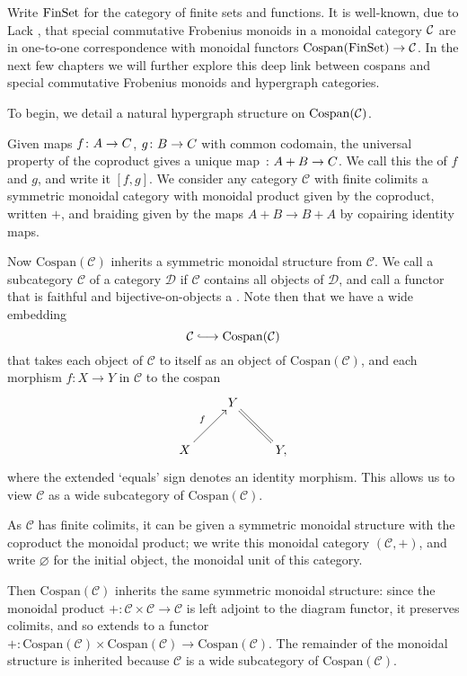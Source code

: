 Write $\mathrm{FinSet}$ for the category of finite sets and functions. It is well-known,
due to Lack \cite{Lac0}, that special commutative Frobenius monoids in a
monoidal category $\mathcal C$ are in one-to-one correspondence with monoidal
functors $\operatorname{{Cospan}}(\mathrm{FinSet}) \to \mathcal C$. In the next few chapters we will further
explore this deep link between cospans and special commutative Frobenius monoids
and hypergraph categories. 

To begin, we detail a natural hypergraph structure on $\operatorname{{Cospan}}(\mathcal C)$.

Given maps $f {\colon} A \to C$, $g {\colon} B \to C$ with common codomain, the
universal property of the coproduct gives a unique map ${\colon} A+B \to C$. We
call this the  of $f$ and $g$, and write it $[f,g]$. 
We consider any category $\mathcal C$ with finite colimits a symmetric monoidal category with
monoidal product given by the coproduct, written $+$, and braiding given by the
maps $A+B \to B+A$ by copairing identity maps. 

Now $\mathrm{Cospan(\mathcal C)}$ inherits a symmetric monoidal structure from
$\mathcal C$. We call a subcategory $\mathcal C$ of a category $\mathcal D$
 if $\mathcal C$ contains all objects of $\mathcal D$, and call a
functor that is faithful and bijective-on-objects a .
Note then that we have a wide embedding
\[
  \mathcal C \hooklongrightarrow \mathrm{Cospan(\mathcal C)}
\]
that takes each object of $\mathcal C$ to itself as an object of
$\mathrm{Cospan(\mathcal C)}$, and each morphism $f\colon  X \to Y$ in $\mathcal
C$ to the cospan
\[
  \xymatrix{
    & Y \\
    X \ar[ur]^{f} && Y, \ar@{=}[ul]
  }
\]
where the extended `equals' sign denotes an identity morphism. This allows us to
view $\mathcal C$ as a wide subcategory of $\mathrm{Cospan(\mathcal C)}$.

As $\mathcal C$ has finite colimits, it can be given a symmetric monoidal
structure with the coproduct the monoidal product; we write this monoidal
category $(\mathcal C,+)$, and write $\varnothing$ for the initial object, the
monoidal unit of this category. 

Then $\mathrm{Cospan(\mathcal C)}$ inherits the same symmetric monoidal
structure: since the monoidal product $+\colon \mathcal C \times \mathcal C \to
\mathcal C$ is left adjoint to the diagram functor, it preserves colimits, and
so extends to a functor $+\colon \mathrm{Cospan(\mathcal C)} \times
\mathrm{Cospan(\mathcal C)} \to \mathrm{Cospan(\mathcal C)}$. The remainder of
the monoidal structure is inherited because $\mathcal C$ is a wide subcategory
of $\mathrm{Cospan(\mathcal C)}$.


